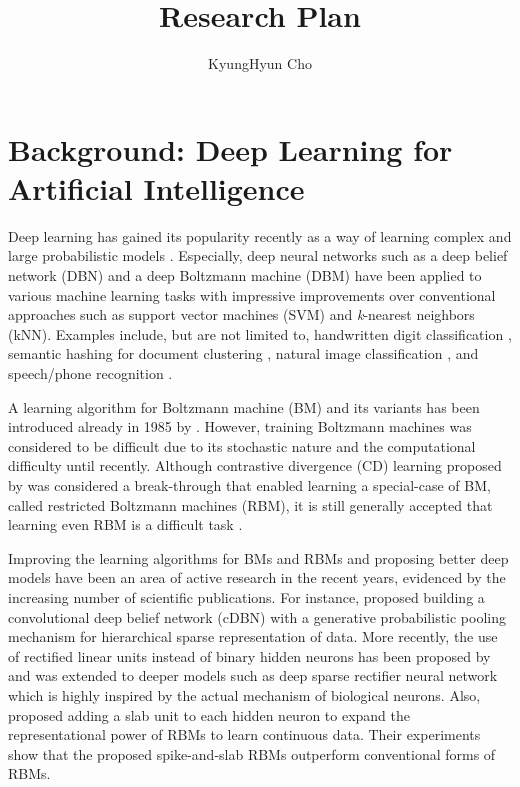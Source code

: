 \documentclass[11pt, oneside]{essay}
\title{Research Plan}
\author{KyungHyun Cho}
\begin{document}
\maketitle

\section{Background: Deep Learning for Artificial
Intelligence}

Deep learning has gained its popularity recently as a way of
learning complex and large probabilistic models \citep[see,
e.g.,][]{Bengio2009a}.  Especially, deep neural networks
such as a deep belief network (DBN) \citep{Hinton2006} and a
deep Boltzmann machine (DBM) \citep{Salakhutdinov2009a} have
been applied to various machine learning tasks with
impressive improvements over conventional approaches such as
support vector machines (SVM) and \emph{k}-nearest neighbors
(kNN).  Examples include, but are not limited to,  
handwritten digit classification
\citep{Hinton2006,Salakhutdinov2009a}, semantic hashing
for document clustering
\citep{Hinton2006,Salakhutdinov2009s}, natural image
classification
\citep{Krizhevsky2009,Krizhevsky2010,Coates2010,Ranzato2010,Ranzato2010a}, and 
speech/phone recognition \citep{Mohamed2010}.

A learning algorithm for Boltzmann machine (BM) and its variants
has been introduced already in 1985 by \citet{Ackley1985}.
However, training Boltzmann machines was considered to be
difficult due to its stochastic nature and the computational
difficulty until recently. Although contrastive divergence
(CD) learning proposed by \citet{Hinton2002} was considered
a break-through that enabled learning a special-case of BM,
called restricted Boltzmann machines (RBM), it is still
generally accepted that learning even RBM is a difficult
task \citep[see, e.g.,][for examples of poor training
results of RBMs]{Schulz2010,Fischer2010,Desjardins2009}.


Improving the learning algorithms for BMs and RBMs and
proposing better deep models have been
an area of active research in the recent years, evidenced by
the increasing number of scientific publications.
For instance, \citet{Lee2009} proposed building a
convolutional deep belief network (cDBN) with a generative
probabilistic pooling mechanism for hierarchical sparse
representation of data. More recently, the use of
rectified linear units instead of binary hidden neurons has
been proposed by \citet{Nair2010} and was extended to deeper
models such as deep sparse rectifier neural network
\citep{Glorot2011} which is highly inspired by the actual
mechanism of biological neurons. Also, \citet{Courville2011}
proposed adding a slab unit to each hidden neuron to expand
the representational power of RBMs to learn continuous data.
Their experiments show that the proposed spike-and-slab RBMs
outperform conventional forms of RBMs.
\end{document}

